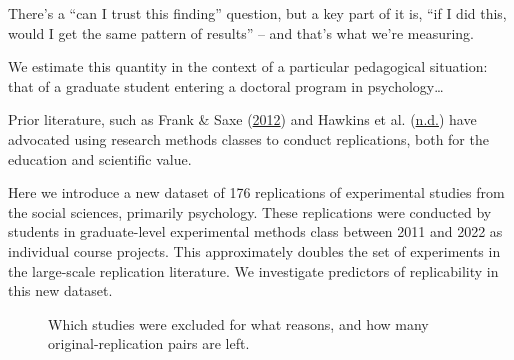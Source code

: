 \documentclass[
  english,
  a4paper,
]{article}
\begin{document}
There's a ``can I trust this finding'' question, but a key part of it is, ``if I did this, would I get the same pattern of results'' -- and that's what we're measuring.

We estimate this quantity in the context of a particular pedagogical situation: that of a graduate student entering a doctoral program in psychology\ldots{}

Prior literature, such as Frank \& Saxe (\protect\hyperlink{ref-frank2012}{2012}) and Hawkins et al. (\protect\hyperlink{ref-hawkins}{n.d.}) have advocated using research methods classes to conduct replications, both for the education and scientific value.

Here we introduce a new dataset of 176 replications of experimental studies from the social sciences, primarily psychology. These replications were conducted by students in graduate-level experimental methods class between 2011 and 2022 as individual course projects. This approximately doubles the set of experiments in the large-scale replication literature. We investigate predictors of replicability in this new dataset.

    
\begin{figure}[ht]
    
\caption{Which studies were excluded for what reasons, and how many original-replication pairs are left.}\label{fig:prisma}
\end{figure}
\end{document}
